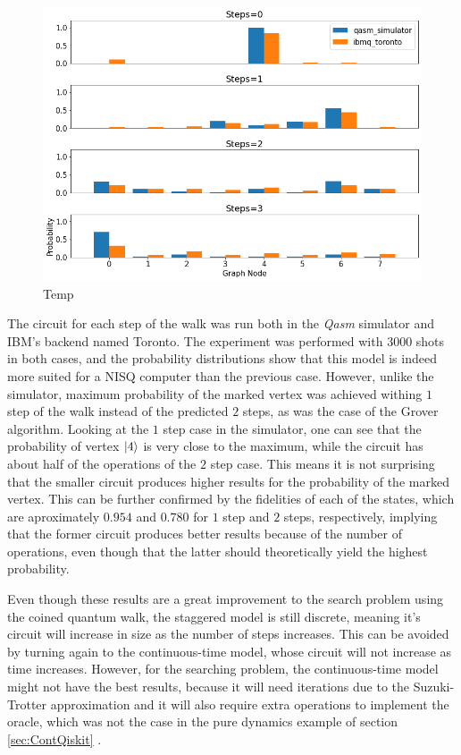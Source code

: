 \documentclass[../../dissertation.tex]{subfiles}
\begin{document}
\begin{figure}[!h]
	\centering
	\includegraphics[scale=0.40]{img/Qiskit/StaggeredQW/Search/stagSearchToronto_N3_S0123.png}
	\caption{Temp}
	\label{fig:stagSearchResultsToronto}
\end{figure}
The circuit for each step of the walk was run both in the \textit{Qasm}
simulator and IBM's backend named Toronto. The experiment was performed with
$3000$ shots in both cases, and the probability distributions show that this
model is indeed more suited for a NISQ computer than the previous case.
However, unlike the simulator, maximum probability of the marked vertex was
achieved withing $1$ step of the walk instead of the predicted $2$ steps, as
was the case of the Grover algorithm. Looking at the $1$ step case in the
simulator, one can see that the probability of vertex $\ket{4}$ is very close
to the maximum, while the circuit has about half of the operations of the $2$
step case. This means it is not surprising that the smaller circuit produces
higher results for the probability of the marked vertex. 
This can be further confirmed by the fidelities of each of the states, which
are aproximately $0.954$ and $0.780$ for $1$ step and $2$ steps, respectively,
implying that the former circuit produces better results because of the number
of operations, even though that the latter should theoretically yield the
highest probability.\par Even though these results are a great improvement to
the search problem using the coined quantum walk, the staggered model is still
discrete, meaning it's circuit will increase in size as the number of steps
increases. This can be avoided by turning again to the continuous-time model,
whose circuit will not increase as time increases.  However, for the searching
problem, the continuous-time model might not have the best results, because it
will need iterations due to the Suzuki-Trotter approximation and it will also
require extra operations to implement the oracle, which was not the case in the
pure dynamics example of section \ref{sec:ContQiskit} .
\end{document}
